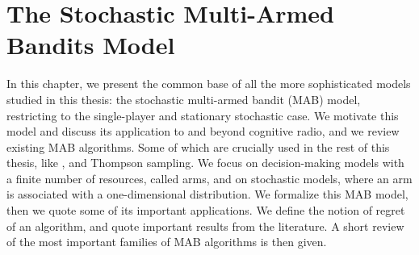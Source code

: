
\chapter{The Stochastic Multi-Armed Bandits Model}
\label{chapter:2}

\graphicspath{{2-Chapters/2-Chapter/Images/}}


\abstractStartChapter{}%
%
In this chapter, we present the common base of all the more sophisticated models studied in this thesis: the stochastic multi-armed bandit (MAB) model, restricting to the single-player and stationary stochastic case.
%
We motivate this model and discuss its application to and beyond cognitive radio, and we review existing MAB algorithms.
Some of which are crucially used in the rest of this thesis, like \UCB, \klUCB{} and Thompson sampling.
%
We focus on decision-making models with a finite number of resources, called arms, and on stochastic models, where an arm is associated with a one-dimensional distribution.
%
We formalize this MAB model, then we quote some of its important applications.
We define the notion of regret of an algorithm, and quote important results from the literature. A short review of the most important families of MAB algorithms is then given.

\minitocStartChapter{}




